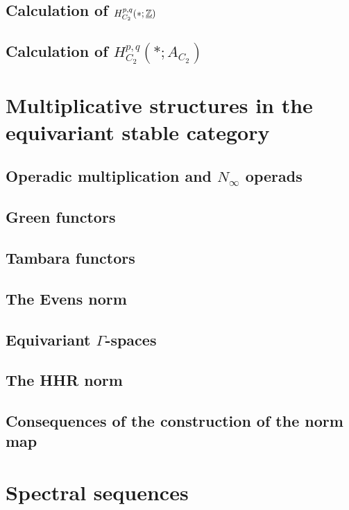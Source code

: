 \documentclass[openany]{style_EHT}
\begin{document}
\section{Calculation of $H_{C_2}^{p,q}(*; \protect\underline{\mathbb Z})$}
	
\section{Calculation of $H_{C_2}^{p,q}(*; A_{C_2})$}
	

\chapter{Multiplicative structures in the equivariant stable category}
\section{Operadic multiplication and $N_\infty$ operads}
	
\section{Green functors}
	
\section{Tambara functors}
	
\section{The Evens norm}
	
\section{Equivariant $\Gamma$-spaces}
	
\section{The HHR norm}
	
\section{Consequences of the construction of the norm map}
	

\chapter{Spectral sequences}
\end{document}
